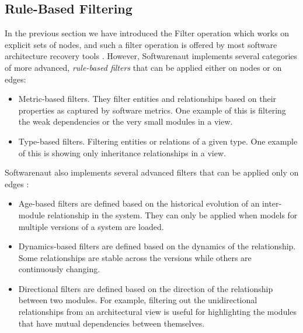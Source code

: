 \documentclass[preprint,12pt]{elsarticle}
\begin{document}
\newpage
\subsection {Rule-Based Filtering}

In the previous section we have introduced the Filter operation which works on explicit sets of nodes, and such a filter operation is offered by most software architecture recovery tools \cite{aracic-filtering}. However, Softwarenaut implements several categories of more advanced, {\em rule-based filters} that can be applied either on nodes or on edges:

\begin{itemize}
\item Metric-based filters. They filter entities and relationships based on their properties as captured by software metrics. One example of this is filtering the weak dependencies or the very small modules in a view.
\item Type-based filters. Filtering entities or relations of a given type. One example of this is showing only inheritance relationships in a view.
\end{itemize}

Softwarenaut also implements several advanced filters that can be applied only on edges \cite{lungu-relevo}:

\begin{itemize}
\item Age-based filters are defined based on the historical evolution of an inter-module relationship in the system. They can only be applied when models for multiple versions of a system are loaded. %

\item Dynamics-based filters are defined based on the dynamics of the relationship. Some relationships are stable across the versions while others are continuously changing. %

\item Directional filters are defined based on the direction of the relationship between two modules. For example, filtering out the unidirectional relationships from an architectural view is useful for highlighting the modules that have mutual dependencies between themselves. 
\end{itemize}
\end{document}
